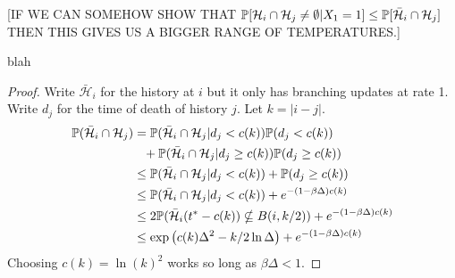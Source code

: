 	[IF WE CAN SOMEHOW SHOW THAT $\mathbb{P}[\mathcal{H}_i \cap \mathcal{H}_j \neq \emptyset|X_1 =1] \leq \mathbb{P}[\bar{\mathcal{H}}_i \cap\mathcal{H}_j]$ THEN THIS GIVES US A BIGGER RANGE OF TEMPERATURES.]
	\begin{lemma}
		blah
	\end{lemma}
	\begin{proof}
		Write $\bar{\mathcal{H}}_i$ for the history at $i$ but it only has branching updates at rate 1. Write $d_j$ for the time of death of history $j$. Let $k = |i-j|$.
		\begin{align}
			\mathbb{P}(\bar{\mathcal{H}}_i \cap \mathcal{H}_j) &= \mathbb{P}(\bar{\mathcal{H}}_i \cap \mathcal{H}_j | d_j < c(k)) \mathbb{P}(d_j < c(k)) \notag \\
			&\phantom{=}+ \mathbb{P}(\bar{\mathcal{H}}_i \cap \mathcal{H}_j | d_j \geq c(k)) \mathbb{P}(d_j \geq c(k))\\
			&\leq \mathbb{P}(\bar{\mathcal{H}}_i \cap \mathcal{H}_j | d_j < c(k)) + \mathbb{P}(d_j \geq c(k))\\
			&\leq \mathbb{P}(\bar{\mathcal{H}}_i \cap \mathcal{H}_j | d_j < c(k)) + e^{-(1 - \beta \Delta) c(k)}\\
			&\leq 2\mathbb{P}(\bar{\mathcal{H}}_i(t^* - c(k)) \nsubseteq B(i, k/2)) + e^{-(1 - \beta \Delta) c(k)}\\
			&\leq \exp\left(c(k) \Delta^2 - k/2 \ln \Delta \right) + e^{-(1 - \beta \Delta) c(k)}\\
		\end{align}
		Choosing $c(k) = \ln(k)^2$ works so long as $\beta \Delta < 1$.
	\end{proof}


